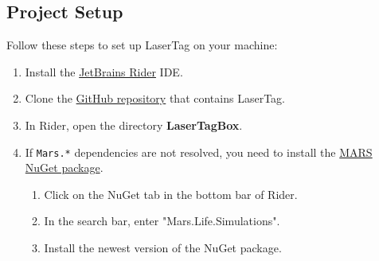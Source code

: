 \documentclass[
  a4paper,
  english,
  DIV=16,
  11pt,
  parskip=half,
  dvipsnames,
  listof=totoc,		     %
  index=totoc,		     %
  bibliography=totoc,	 %
]{scrartcl}
\begin{document}
\subsection{Project Setup} \label{ssec:projsetup}
%
Follow these steps to set up LaserTag on your machine:
%
\begin{enumerate}
  \item Install the \href{https://www.jetbrains.com/rider/}{JetBrains Rider} IDE.
  \item Clone the \href{https://github.com/MARS-Group-HAW/model-mars-laser-tag-game}{GitHub repository} that contains LaserTag.
  \item In Rider, open the directory \textbf{LaserTagBox}.
  \item If \texttt{Mars.*} dependencies are not resolved, you need to install the \href{https://www.nuget.org/packages/Mars.Life.Simulations}{MARS NuGet package}.
  \begin{enumerate}
    \item Click on the NuGet tab in the bottom bar of Rider.
    \item In the search bar, enter "Mars.Life.Simulations".
    \item Install the newest version of the NuGet package.
  \end{enumerate}
\end{enumerate}
%
\end{document}
